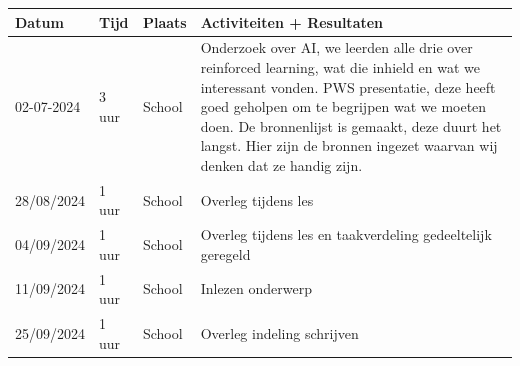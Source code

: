 \documentclass[a4paper,11pt]{report}
\begin{document}
\begin{longtable}{|p{}|p{}|p{}|p{}|}
    \hline
    \textbf{Datum} & \textbf{Tijd} & \textbf{Plaats} & \textbf{Activiteiten + Resultaten}                                                                                                                                                                                                                                                                                   \\
    \hline
    02-07-2024     & 3 uur         & School          & Onderzoek over AI, we leerden alle drie over reinforced learning, wat die inhield en wat we interessant vonden. PWS presentatie, deze heeft goed geholpen om te begrijpen wat we moeten doen. De bronnenlijst is gemaakt, deze duurt het langst. Hier zijn de bronnen ingezet waarvan wij denken dat ze handig zijn. \\
    \hline
    28/08/2024     & 1 uur         & School          & Overleg tijdens les                                                                                                                                                                                                                                                                                                  \\
    \hline
    04/09/2024     & 1 uur         & School          & Overleg tijdens les en taakverdeling gedeeltelijk geregeld                                                                                                                                                                                                                                                           \\
    \hline
    11/09/2024     & 1 uur         & School          & Inlezen onderwerp                                                                                                                                                                                                                                                                                                    \\
    \hline
    25/09/2024     & 1 uur         & School          & Overleg indeling schrijven                                                                                                                                                                                                                                                                                           \\

\end{longtable}
\end{document}
